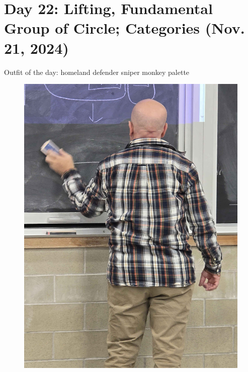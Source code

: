 \section{Day 22: Lifting, Fundamental Group of Circle; Categories (Nov. 21, 2024)}
Outfit of the day: homeland defender sniper monkey palette
\begin{figure}[h]
    \centering
    \includegraphics[scale=0.1]{MAT327 Notes/Dror Shirts/dror day 22 shirt.jpg}
\end{figure}


